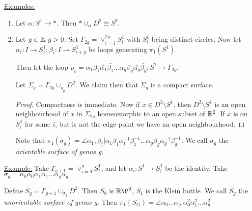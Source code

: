 \documentclass[10pt,a4paper]{article}
\begin{document}
\underline{Examples:}
\begin{enumerate}
\item Let $\alpha:S^1 \to \ast$. Then $\ast \cup_{\alpha} D^2 \cong S^2$.
\item Let $g \in \mathbb{Z}, g>0$. Set $\Gamma_{2g} = \vee_{i=1}^{2g} S_i^1$ with $S_i^1$ being distinct circles. Now let $\alpha_i: I \to S_i^1; \beta_i : I \to S_{i+g}^1$ be loops generating $\pi_1(S^1)$.

Then let the loop $\rho_g = \alpha_1 \beta_1 \bar{\alpha_1} \bar{\beta_1} \ldots \alpha_g \beta_g \bar{\alpha_g} \bar{\beta_g}:S^2 \to \Gamma_{2g}$.

Let $\Sigma_g = \Gamma_{2g} \cup_{\rho_g} D^2$. We claim then that $\Sigma_{g}$ is a compact surface.
\begin{proof}
Compactness is immediate. Now if $x \in D^2 \setminus S^1$, then $D^2 \setminus S^1$ is an open neighbourhood of $x$ in $\Sigma_{2g}$ homeomorphic to an open subset of $\mathbb{R}^2$. If $x$ is on $S_i^1$ for some $i$, but is not the edge point we have an open neighbourhood.
\end{proof}
Note that $\pi_1(\sigma_g) = \angle{\alpha_1, \beta_i | \alpha_1\beta_1\alpha_1^{-1}\beta_1^{-1}\ldots \alpha_g\beta_g\alpha_g^{-1}\beta_g^{-1}}$. We call $\sigma_g$ the \emph{orientable surface of genus g}.
\end{enumerate}
\underline{Example:}
Take $\Gamma_{g+1} = \vee_{i=0}^g S_i^1$, and let $\alpha_i:S^1 \to S_i^1$ be the identity. Take $\sigma_g = \alpha_0\alpha_0\alpha_1\alpha_1\ldots\alpha_g\alpha_g$

Define $S_g = \Gamma_{g+1}\cup_{\sigma_g}D^2$. Then $S_0$ is $\R\P^2$, $S_1$ is the Klein bottle. We call $S_g$ the \emph{unorientable surface of genus g}. Then $\pi_1(S_G) = \angle{\alpha_0\ldots\alpha_g | \alpha_0^2\alpha_1^2\ldots\alpha_g^2}$
\end{document}
